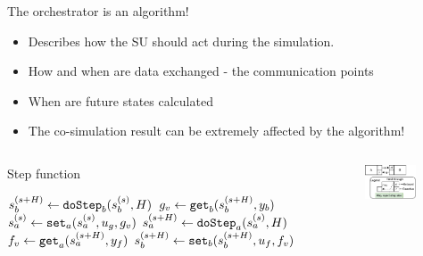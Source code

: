 \documentclass{beamer}
\begin{document}
\begin{frame}{The orchestrator is an algorithm!}
    \begin{itemize}
        \item Describes how the SU should act during the simulation.
        \item How and when are data exchanged - the communication points
        \item When are future states calculated
        \item The co-simulation result can be extremely affected by the algorithm!
    \end{itemize}

    \begin{columns}[T] %
        \begin{column}{.48\textwidth}
            \begin{algorithm}[H]
                \caption{Step function}
                \label{alg:algorithm_simpleexample}
                \begin{algorithmic}[1]
                  \scriptsize
                  \State $s_{b}^{(s+H)} \gets \mathtt{doStep}_{b}(s_{b}^{(s)}, H)$
                  \State $g_v \gets \mathtt{get}_{b}(s_{b}^{(s+H)}, y_{b})$
                  \State $s_{a}^{(s)} \gets \mathtt{set}_{a}(s_{a}^{(s)}, u_{g}, g_v)$
                  \State $s_{a}^{(s+H)} \gets \mathtt{doStep}_{a}(s_{a}^{(s)}, H)$
                  \State $f_v \gets \mathtt{get}_{a}(s_{a}^{(s+H)}, y_{f})$
                  \State $s_{b}^{(s+H)} \gets \mathtt{set}_{b}(s_{b}^{(s+H)}, u_{f}, f_v)$
                \end{algorithmic}
              \end{algorithm}
    \end{column}%
    \hfill%
    \begin{column}{.48\textwidth}
        \begin{figure}    
            \includegraphics[width=0.9\textwidth]{images/simple_example_legend.pdf}
        \end{figure}
    \end{column}%
    \end{columns}
\end{frame}
\end{document}

